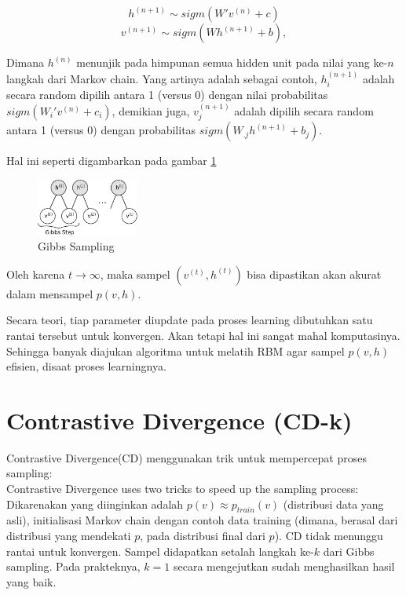 \documentclass[12pt]{article}
\begin{document}
\[h^{(n+1)} \sim sigm(W'v^{(n)} + c)\] 
\[v^{(n+1)} \sim sigm(W h^{(n+1)} + b),\]

Dimana $h^{(n)}$ menunjik pada himpunan semua hidden unit pada nilai yang ke-$n$ langkah dari Markov chain. Yang artinya adalah sebagai contoh, $h^{(n+1)}_i$ adalah secara random dipilih antara 1 (versus 0) dengan nilai probabilitas $sigm(W_i'v^{(n)} + c_i)$, demikian juga, $v^{(n+1)}_j$ adalah dipilih secara random antara 1 (versus 0) dengan probabilitas $sigm(W_{.j} h^{(n+1)} + b_j)$.

Hal ini seperti digambarkan pada gambar \ref{fig:markov_chain}
\begin{figure}
	\centering
	\includegraphics[width=0.3\textwidth]
		{pics/markov_chain.png}
	\caption{Gibbs Sampling}
	\label{fig:markov_chain}
\end{figure}


Oleh karena $t \rightarrow \infty$, maka sampel $(v^{(t)}, h^{(t)})$ bisa dipastikan akan akurat dalam mensampel $p(v,h)$.

Secara teori, tiap parameter diupdate pada proses learning dibutuhkan satu rantai tersebut untuk konvergen. Akan tetapi hal ini sangat mahal komputasinya. Sehingga banyak diajukan algoritma untuk melatih RBM agar sampel $p(v,h)$ efisien, disaat proses learningnya.

\section{Contrastive Divergence (CD-k)}

Contrastive Divergence(CD) menggunakan trik untuk mempercepat proses sampling: \\


Contrastive Divergence uses two tricks to speed up the sampling process:
Dikarenakan yang diinginkan adalah $p(v) \approx p_{train}(v)$ (distribusi data yang asli), initialisasi  Markov chain dengan contoh data training (dimana, berasal dari distribusi yang mendekati $p$, pada distribusi final dari $p$). CD tidak menunggu rantai untuk konvergen. Sampel didapatkan setalah langkah ke-$k$ dari Gibbs sampling. Pada prakteknya, $k=1$ secara mengejutkan sudah menghasilkan hasil yang baik.\\
\end{document}
